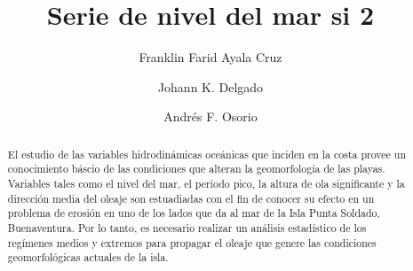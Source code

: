 \documentclass[5p,times,authoryear]{elsarticle}
\begin{document}
\begin{frontmatter}






\title{Serie de nivel del mar si 2}


\author[First]{Franklin Farid Ayala Cruz}

\author[Second]{Johann K. Delgado}

\author[Third]{Andrés F. Osorio}


\address[First]{Ingeniería Civil, Universidad Nacional de Colombia, Sede Medellín, Colombia}
\address[Second]{OCEANICOS Research Group, Universidad Nacional de Colombia, Sede Medellín, Colombia}
\address[Third]{OCEANICOS Research Group, Universidad Nacional de Colombia, Sede Medellín, Colombia}


\begin{abstract}

El estudio de las variables hidrodinámicas oceánicas que inciden en la costa provee un conocimiento báscio de las condiciones que alteran la geomorfología de las playas. Variables tales como el nivel del mar, el período pico, la altura de ola significante y la dirección media del oleaje son estuadiadas con el fin de conocer su efecto en un problema de erosión en uno de los lados que da al mar de la Isla Punta Soldado, Buenaventura. Por lo tanto, es necesario realizar un análisis estadístico de los regímenes medios y extremos para propagar el oleaje que genere las condiciones geomorfológicas actuales de la isla.


\end{abstract}
\end{frontmatter}
\end{document}
